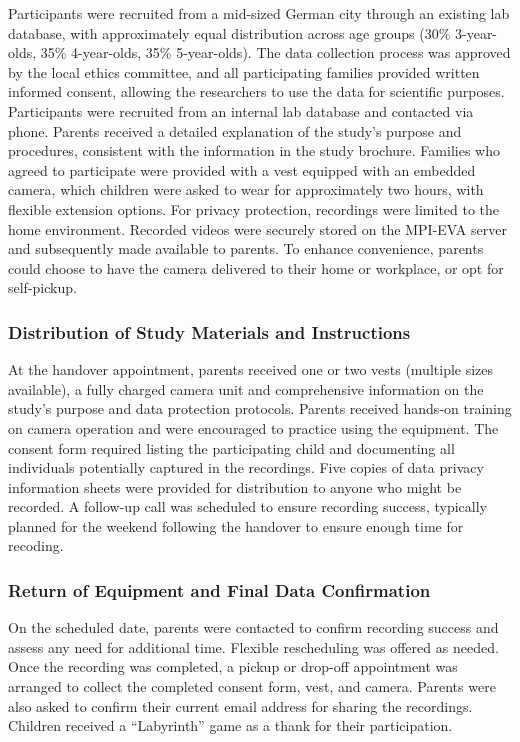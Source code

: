 \documentclass[
  man,floatsintext]{apa6}
\begin{document}
Participants were recruited from a mid-sized German city through an existing lab database, with approximately equal distribution across age groups (30\% 3-year-olds, 35\% 4-year-olds, 35\% 5-year-olds). The data collection process was approved by the local ethics committee, and all participating families provided written informed consent, allowing the researchers to use the data for scientific purposes. Participants were recruited from an internal lab database and contacted via phone. Parents received a detailed explanation of the study's purpose and procedures, consistent with the information in the study brochure. Families who agreed to participate were provided with a vest equipped with an embedded camera, which children were asked to wear for approximately two hours, with flexible extension options. For privacy protection, recordings were limited to the home environment. Recorded videos were securely stored on the MPI-EVA server and subsequently made available to parents. To enhance convenience, parents could choose to have the camera delivered to their home or workplace, or opt for self-pickup.

\subsubsection{Distribution of Study Materials and Instructions}\label{distribution-of-study-materials-and-instructions-1}

At the handover appointment, parents received one or two vests (multiple sizes available), a fully charged camera unit and comprehensive information on the study's purpose and data protection protocols. Parents received hands-on training on camera operation and were encouraged to practice using the equipment. The consent form required listing the participating child and documenting all individuals potentially captured in the recordings. Five copies of data privacy information sheets were provided for distribution to anyone who might be recorded. A follow-up call was scheduled to ensure recording success, typically planned for the weekend following the handover to ensure enough time for recoding.

\subsubsection{Return of Equipment and Final Data Confirmation}\label{return-of-equipment-and-final-data-confirmation-1}

On the scheduled date, parents were contacted to confirm recording success and assess any need for additional time. Flexible rescheduling was offered as needed. Once the recording was completed, a pickup or drop-off appointment was arranged to collect the completed consent form, vest, and camera. Parents were also asked to confirm their current email address for sharing the recordings. Children received a ``Labyrinth'' game as a thank for their participation.
\end{document}
